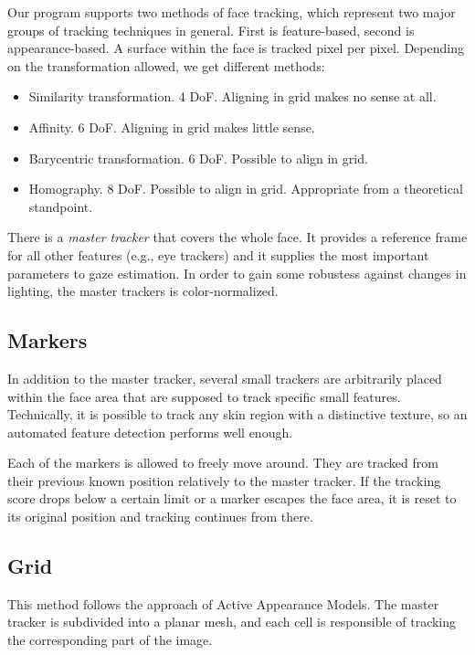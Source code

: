 Our program supports two methods of face tracking, which represent two major groups of tracking techniques in general.
First is feature-based, second is appearance-based.
A surface within the face is tracked pixel per pixel.
Depending on the transformation allowed, we get different methods:

\begin{itemize}
\item Similarity transformation. 4 DoF. Aligning in grid makes no sense at all.
\item Affinity. 6 DoF. Aligning in grid makes little sense.
\item Barycentric transformation. 6 DoF. Possible to align in grid.
\item Homography. 8 DoF. Possible to align in grid. Appropriate from a theoretical standpoint.
\end{itemize}


There is a \textit{master tracker} that covers the whole face.
It provides a reference frame for all other features (e.g., eye trackers) and it supplies the most important parameters to gaze estimation.
In order to gain some robustess against changes in lighting, the master trackers is color-normalized.

\subsection{Markers}

In addition to the master tracker, several small trackers are arbitrarily placed within the face area that are supposed to track specific small features.
Technically, it is possible to track any skin region with a distinctive texture, so an automated feature detection performs well enough.

Each of the markers is allowed to freely move around.
They are tracked from their previous known position relatively to the master tracker.
If the tracking score drops below a certain limit or a marker escapes the face area, it is reset to its original position and tracking continues from there.

\subsection{Grid}

This method follows the approach of Active Appearance Models.
The master tracker is subdivided into a planar mesh, and each cell is responsible of tracking the corresponding part of the image.

